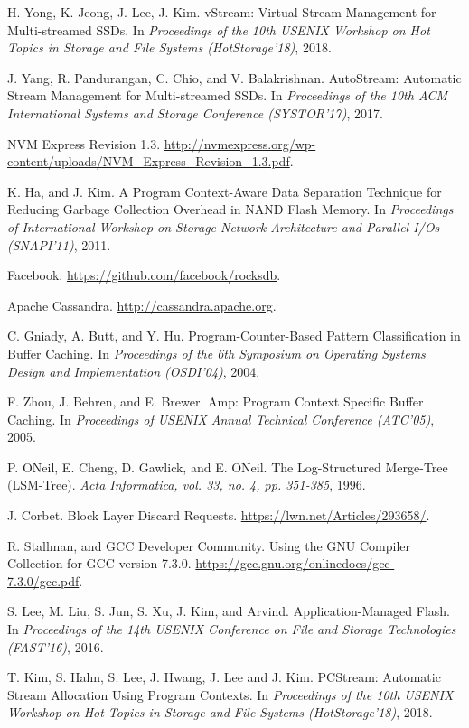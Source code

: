 \begin{thebibliography}{00}
H. Yong, K. Jeong, J. Lee, J. Kim.
vStream: Virtual Stream Management for Multi-streamed SSDs.
In \textit{Proceedings of the 10th USENIX Workshop on Hot Topics in Storage
and File Systems (HotStorage'18)}, 2018.

J. Yang, R. Pandurangan, C. Chio, and V. Balakrishnan.
AutoStream: Automatic Stream Management for Multi-streamed SSDs.
In \textit{Proceedings of the 10th ACM International Systems and Storage Conference (SYSTOR'17)}, 2017.


NVM Express Revision 1.3.
\url{http://nvmexpress.org/wp-content/uploads/NVM_Express_Revision_1.3.pdf}.

K. Ha, and J. Kim.
A Program Context-Aware Data Separation Technique for Reducing Garbage Collection Overhead in NAND Flash Memory.
In \textit{Proceedings of International Workshop on Storage Network Architecture 
and Parallel I/Os (SNAPI'11)}, 2011.

Facebook. 
\url{https://github.com/facebook/rocksdb}.

Apache Cassandra. 
\url{http://cassandra.apache.org}.

C. Gniady, A. Butt, and Y. Hu.
Program-Counter-Based Pattern Classification in Buffer Caching.
In \textit{Proceedings of the 6th Symposium on Operating Systems Design and Implementation (OSDI'04)}, 2004.

F. Zhou, J. Behren, and E. Brewer.
Amp: Program Context Specific Buffer Caching.
In \textit{Proceedings of USENIX Annual Technical Conference (ATC'05)}, 2005.


P. ONeil, E. Cheng, D. Gawlick, and E. ONeil.
The Log-Structured Merge-Tree (LSM-Tree).
\textit{Acta Informatica, vol. 33, no. 4, pp. 351-385}, 1996.

J. Corbet.
Block Layer Discard Requests.
\url{https://lwn.net/Articles/293658/}.

R. Stallman, and GCC Developer Community.
Using the GNU Compiler Collection for GCC version 7.3.0.
\url{https://gcc.gnu.org/onlinedocs/gcc-7.3.0/gcc.pdf}.


S. Lee, M. Liu, S. Jun, S. Xu, J. Kim, and Arvind.
Application-Managed Flash.
In \textit{Proceedings of the 14th USENIX Conference on File and Storage
Technologies (FAST'16)}, 2016.

T. Kim, S. Hahn, S. Lee, J. Hwang, J. Lee and J. Kim.
PCStream: Automatic Stream Allocation Using Program Contexts.
In \textit{Proceedings of the 10th USENIX Workshop on Hot Topics in Storage
and File Systems (HotStorage'18)}, 2018.



\end{thebibliography}
